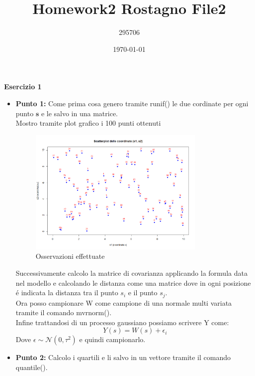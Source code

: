 \documentclass[a4paper,12pt]{article}
\begin{document}
	\title{\textbf{Homework2 Rostagno File2}}
	\author{295706}
	\date{\today}
	\maketitle
	
	\centering \textbf{Esercizio 1}\\
	\begin{itemize}
		\item \textbf{Punto 1:}
		Come prima cosa genero tramite runif() le due cordinate per ogni punto $\textbf{s}$ e le salvo in una matrice.\\
		Mostro tramite plot grafico i 100 punti ottenuti
		\begin{figure}[h] %
			\centering %
			\includegraphics[width=0.8\textwidth]{punti.png} %
			\caption{Osservazioni effettuate } %
			\label{fig:immagine} %
		\end{figure}
		\newline
		Successivamente calcolo la matrice di covarianza applicando la formula data nel modello e calcolando le distanza come una matrice dove in ogni posizione é indicata la distanza tra il punto $s_i$ e il punto $s_j$.\\
		Ora posso campionare W come campione di una normale multi variata tramite il comando mvrnorm().\\
		Infine trattandosi di un processo gaussiano possiamo scrivere Y come:
		\[
		Y(s)=W(s)+\epsilon_i 
		\]
		Dove $\epsilon \sim \mathcal{N}(0, \tau^2)$ e quindi campionarlo.
		\item \textbf{Punto 2:}
		Calcolo i quartili e li salvo in un vettore tramite il comando quantile().\\

\end{itemize}
\end{document}
